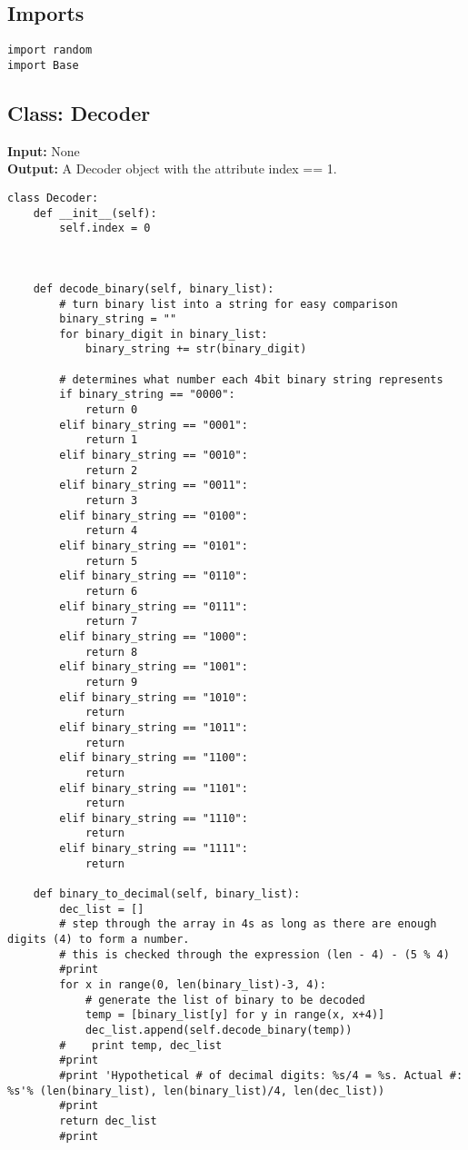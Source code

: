 \documentclass[a4paper]{article}
\begin{document}
\subsection{Imports}
\label{sec-5-1}
\begin{verbatim}
import random
import Base
\end{verbatim}
\subsection{Class: Decoder}
\label{sec-5-2}
\textbf{Input:} None\\
\textbf{Output:} A Decoder object with the attribute index == 1.\\
\begin{verbatim}
class Decoder:
    def __init__(self):
        self.index = 0



    def decode_binary(self, binary_list):
        # turn binary list into a string for easy comparison
        binary_string = ""
        for binary_digit in binary_list:
            binary_string += str(binary_digit)

        # determines what number each 4bit binary string represents
        if binary_string == "0000":
            return 0
        elif binary_string == "0001":
            return 1
        elif binary_string == "0010":
            return 2
        elif binary_string == "0011":
            return 3
        elif binary_string == "0100":
            return 4
        elif binary_string == "0101":
            return 5
        elif binary_string == "0110":
            return 6
        elif binary_string == "0111":
            return 7
        elif binary_string == "1000":
            return 8
        elif binary_string == "1001":
            return 9
        elif binary_string == "1010":
            return
        elif binary_string == "1011":
            return
        elif binary_string == "1100":
            return
        elif binary_string == "1101":
            return
        elif binary_string == "1110":
            return
        elif binary_string == "1111":
            return

    def binary_to_decimal(self, binary_list):
        dec_list = []
        # step through the array in 4s as long as there are enough digits (4) to form a number.
        # this is checked through the expression (len - 4) - (5 % 4)
        #print
        for x in range(0, len(binary_list)-3, 4):
            # generate the list of binary to be decoded
            temp = [binary_list[y] for y in range(x, x+4)]
            dec_list.append(self.decode_binary(temp))
        #    print temp, dec_list 
        #print
        #print 'Hypothetical # of decimal digits: %s/4 = %s. Actual #: %s'% (len(binary_list), len(binary_list)/4, len(dec_list))
        #print
        return dec_list
        #print



\end{verbatim}
\end{document}

